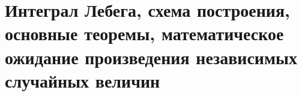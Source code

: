 \section{Интеграл Лебега, схема построения, основные теоремы, математическое ожидание произведения независимых случайных величин}

